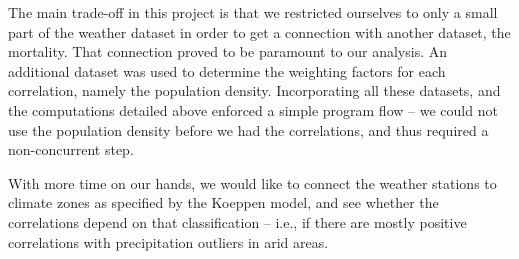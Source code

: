 \documentclass[
10pt, %
a4paper, %
oneside, %
headinclude,footinclude, %
useAMS,
usenatbib
]{template/mn2e}  %
\begin{document}
The main trade-off in this project is that we restricted ourselves to only a small part of the  weather dataset in order to get a connection with another dataset, the mortality. That connection proved to be paramount to our analysis. An additional dataset was used to determine the weighting factors for each correlation, namely the population density. Incorporating all these datasets, and the computations detailed above enforced a simple program flow -- we could not use the population density before we had the correlations, and thus required a non-concurrent step.

With more time on our hands, we would like to connect the weather stations to climate zones as specified by the Koeppen model, and see whether the correlations depend on that classification -- i.e., if there are mostly positive correlations with precipitation outliers in arid areas.

%
%
\end{document}
